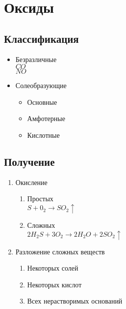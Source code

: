 \section{Оксиды}
\subsection{Классификация}
\begin{itemize}
    \item Безразличные\\
    $CO$\\
    $NO$

    \item Солеобразующие
    \begin{itemize}
        \item Основные   
        \item Амфотерные 
        \item Кислотные  
    \end{itemize}
\end{itemize}



\subsection{Получение}
\begin{enumerate}
    \item Окисление
    \begin{enumerate}
        \item Простых\\
            $S + 0_2 \rightarrow SO_2\uparrow$
        \item Сложных\\
            $2H_2S + 3O_2 \rightarrow 2H_2O + 2SO_2\uparrow$
    \end{enumerate}

    \item Разложение сложных веществ
    \begin{enumerate}
        \item Некоторых солей
        \item Некоторых кислот
        \item Всех нерастворимых оснований
    \end{enumerate}
\end{enumerate}



